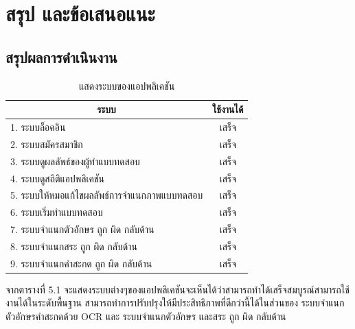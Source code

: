 \documentclass[12pt,oneside,openright,a4paper]{cpe-thai-project}
\begin{document}
\chapter{สรุป และข้อเสนอแนะ}
\section{สรุปผลการดำเนินงาน}
\begin{table}[!h]\centering
  \caption{แสดงระบบของแอปพลิเคชัน}\label{tbl:application1}
  \begin{tabular}{|l|c|} \hline
    \multicolumn{1}{|c|}{ระบบ}& ใช้งานได้ \\ \hline
    1.	ระบบล็อคอิน & เสร็จ \\ \hline
    2.	ระบบสมัครสมาชิก & เสร็จ \\ \hline
    3.	ระบบดูผลลัพธ์ของผู้ทำแบบทดสอบ & เสร็จ \\ \hline
    4.	ระบบดูสถิติแอปพลิเคชัน & เสร็จ \\ \hline
    5.	ระบบให้หมอแก้ไขผลลัพธ์การจำแนกภาพแบบทดสอบ & เสร็จ \\ \hline
    6.	ระบบเริ่มทำแบบทดสอบ & เสร็จ \\ \hline
    7.	ระบบจำแนกตัวอักษร ถูก ผิด กลับด้าน & เสร็จ \\ \hline
    8.	ระบบจำแนกสระ ถูก ผิด กลับด้าน & เสร็จ \\ \hline
    9.	ระบบจำแนกคำสะกด ถูก ผิด กลับด้าน & เสร็จ \\ \hline
  \end{tabular}
  \end{table}
  จากตารางที่ 5.1 จะแสดงระบบต่างๆของแอปพลิเคชันจะเห็นได้ว่าสามารถทำได้เสร็จสมบูรณ์สามารถใช้งานได้ในระดับพื้นฐาน สามารถทำการปรับปรุงให้มีประสิทธิภาพที่ดีกว่านี้ได้ในส่วนของ
  ระบบจำแนกตัวอักษรคำสะกดด้วย OCR และ ระบบจำแนกตัวอักษร และสระ ถูก ผิด กลับด้าน
\end{document}
